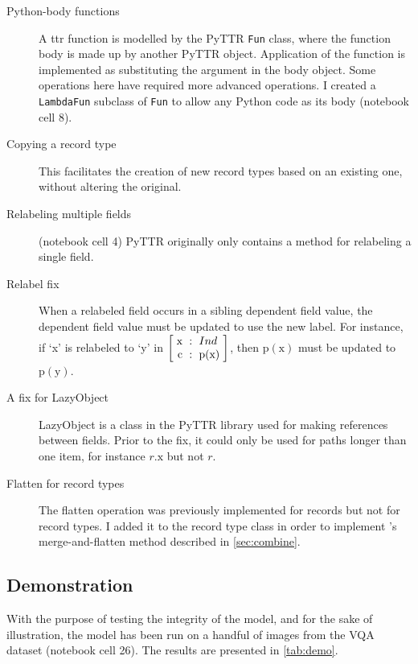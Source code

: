\begin{description}
\item[Python-body functions] A \gls{ttr} function is modelled by the PyTTR \texttt{Fun} class, where the function body is made up by another PyTTR object.
Application of the function is implemented as substituting the argument in the body object.
Some operations here have required more advanced operations.
I created a \texttt{LambdaFun} subclass of \texttt{Fun} to allow any Python code as its body (notebook cell 8).
\item[Copying a record type] This facilitates the creation of new record types based on an existing one, without altering the original.
\item[Relabeling multiple fields] (notebook cell 4) PyTTR originally only contains a method for relabeling a single field.
\item[Relabel fix] When a relabeled field occurs in a sibling dependent field value, the dependent field value must be updated to use the new label.
For instance, if `x' is relabeled to `y' in $\rec{\text{x} &:& Ind \\ \text{c} &:& \text{p}(\text{x})}$, then $\text{p}(\text{x})$ must be updated to $\text{p}(\text{y})$.
\item[A fix for LazyObject] LazyObject is a class in the PyTTR library used for making references between fields.
Prior to the fix, it could only be used for paths longer than one item, for instance $r.\text{x}$ but not $r$.
\item[Flatten for record types] The flatten operation was previously implemented for records but not for record types.
I added it to the record type class in order to implement \citeauthor{CooperTypetheorylanguage2016}'s merge-and-flatten method described in \autoref{sec:combine}.
\end{description}



\subsection{Demonstration}

With the purpose of testing the integrity of the model, and for the sake of illustration, the model has been run on a handful of images from the VQA dataset \citep{AgrawalVQAVisualQuestion2015} (notebook cell 26).
The results are presented in \autoref{tab:demo}.

